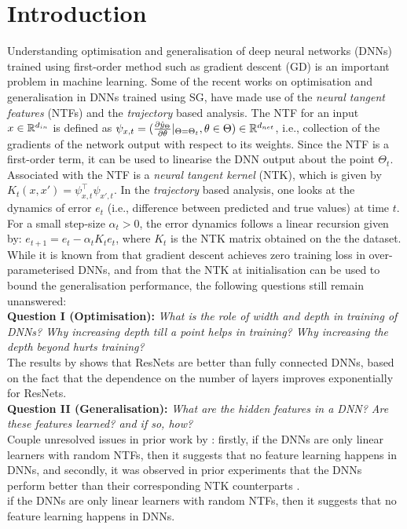 \section{Introduction}
Understanding optimisation and generalisation of deep neural networks (DNNs) trained using first-order method such as gradient descent (GD) is an important problem in machine learning. Some of the recent works on optimisation and generalisation in DNNs trained using SG, have made use of the \emph{neural tangent features} (NTFs) and the \emph{trajectory} based analysis. The NTF for an input $x\in \mathbb{R}^{d_{in}}$ is defined as $\psi_{x,t}=(\frac{\partial \hat{y}_{\Theta}}{\partial \theta}|_{\Theta=\Theta_t},\theta \in \Theta)\in \mathbb{R}^{d_{net}}$, i.e., collection of the gradients of the network output with respect to its weights. Since the NTF is a first-order term, it can be used to linearise the DNN output about the point $\Theta_t$. Associated with the NTF is a \emph{neural tangent kernel} (NTK), which is given by $K_t(x,x')=\psi^\top_{x,t}\psi_{x',t}$. In the \emph{trajectory} based analysis, one looks at the dynamics of error $e_t$  (i.e., difference between predicted and true values) at time $t$. For a small step-size $\alpha_t>0$, the error dynamics follows a linear recursion given by: $e_{t+1}=e_t-\alpha_tK_te_t$, where $K_t$ is the NTK matrix obtained on the the dataset. While it is known from \cite{dudnn} that gradient descent achieves zero training loss in over-parameterised DNNs, and from \cite{cao2019generalization} that the NTK at initialisation can be used to bound the generalisation performance, the following questions still remain unanswered: \hfill\\
\textbf{Question I (Optimisation):} \emph{What is the role of width and depth in training of DNNs? Why increasing depth till a point helps in training? Why increasing the depth beyond hurts training?}\\
The results by \cite{dudnn} shows that ResNets are better than fully connected DNNs, based on the fact that the dependence on the number of layers improves exponentially for ResNets. \\
\textbf{Question II (Generalisation):} \emph{What are the hidden features in a DNN? Are these features learned? and if so, how?} \hfill\\
Couple unresolved issues in prior work by \cite{arora2019exact,cao2019generalization}: firstly, if the DNNs are only linear learners with random NTFs, then it suggests that no feature learning happens in DNNs, and secondly, it was observed in prior experiments that the DNNs perform better than their corresponding NTK counterparts \cite{arora2019exact,lee2017deep}. \hfill\\if the DNNs are only linear learners with random NTFs, then it suggests that no feature learning happens in DNNs.\\
